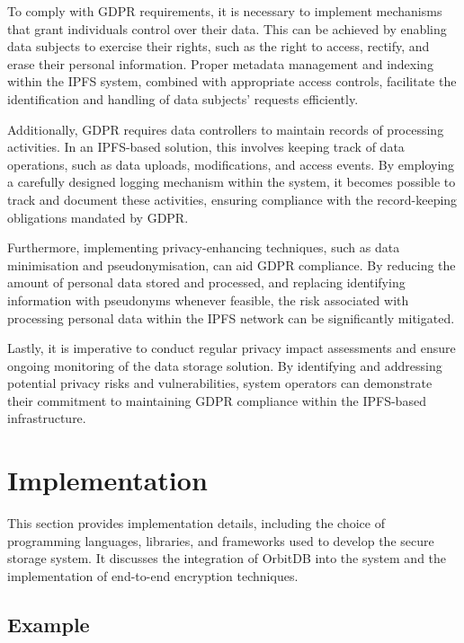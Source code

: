 \documentclass[a4paper,11 pt]{article}
\theoremstyle{definition}
\begin{document}
To comply with GDPR requirements, it is necessary to implement mechanisms that grant individuals control over their data. This can be achieved by enabling data subjects to exercise their rights, such as the right to access, rectify, and erase their personal information. Proper metadata management and indexing within the IPFS system, combined with appropriate access controls, facilitate the identification and handling of data subjects' requests efficiently.

Additionally, GDPR requires data controllers to maintain records of processing activities. In an IPFS-based solution, this involves keeping track of data operations, such as data uploads, modifications, and access events. By employing a carefully designed logging mechanism within the system, it becomes possible to track and document these activities, ensuring compliance with the record-keeping obligations mandated by GDPR.

Furthermore, implementing privacy-enhancing techniques, such as data minimisation and pseudonymisation, can aid GDPR compliance. By reducing the amount of personal data stored and processed, and replacing identifying information with pseudonyms whenever feasible, the risk associated with processing personal data within the IPFS network can be significantly mitigated.

Lastly, it is imperative to conduct regular privacy impact assessments and ensure ongoing monitoring of the data storage solution. By identifying and addressing potential privacy risks and vulnerabilities, system operators can demonstrate their commitment to maintaining GDPR compliance within the IPFS-based infrastructure.

\section{Implementation}
This section provides implementation details, including the choice of programming languages, libraries, and frameworks used to develop the secure storage system. It discusses the integration of OrbitDB into the system and the implementation of end-to-end encryption techniques.

\subsection{Example}
\end{document}
